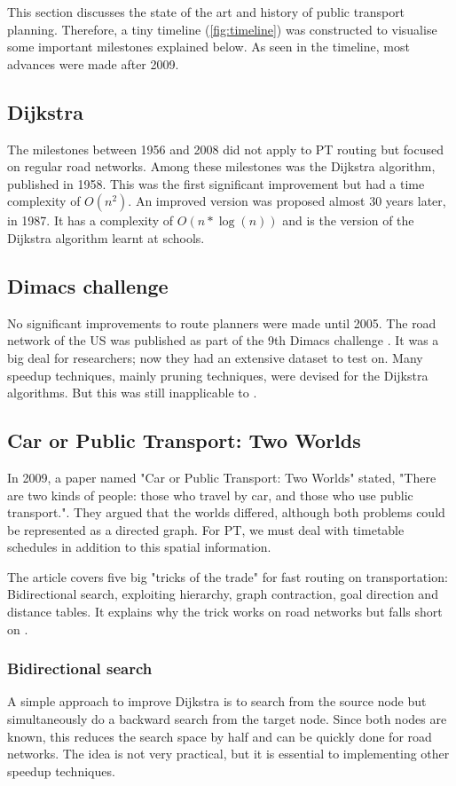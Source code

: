 This section discusses the state of the art and history of public transport planning. Therefore, a tiny timeline (\autoref{fig:timeline}) was constructed to visualise some important milestones explained below. As seen in the timeline, most advances were made after 2009.

\subsection{Dijkstra}
The milestones between 1956 and 2008 did not apply to PT routing but focused on regular road networks. Among these milestones was the Dijkstra algorithm, published in 1958. This was the first significant improvement but had a time complexity of $O(n^2)$. An improved version was proposed almost 30 years later, in 1987. It has a complexity of $O(n*\log(n))$ and is the version of the Dijkstra algorithm learnt at schools.
\subsection{Dimacs challenge}
No significant improvements to route planners were made until 2005. The road network of the US was published as part of the 9th Dimacs challenge \cite{noauthor_9th_2017}. It was a big deal for researchers; now they had an extensive dataset to test on. Many speedup techniques, mainly pruning techniques, were devised for the Dijkstra algorithms. But this was still inapplicable to .

\subsection{Car or Public Transport: Two Worlds}
In 2009, a paper named "Car or Public Transport: Two Worlds" \cite{bast_car_2009} stated, "There are two kinds of people: those who travel by car, and those who use public transport.". They argued that the worlds differed, although both problems could be represented as a directed graph. For PT, we must deal with timetable schedules in addition to this spatial information.

The article covers five big "tricks of the trade" for fast routing on transportation: Bidirectional search, exploiting hierarchy, graph contraction, goal direction and distance tables. It explains why the trick works on road networks but falls short on .

\subsubsection{Bidirectional search}
A simple approach to improve Dijkstra is to search from the source node but simultaneously do a backward search from the target node. Since both nodes are known, this reduces the search space by half and can be quickly done for road networks. The idea is not very practical, but it is essential to implementing other speedup techniques.

